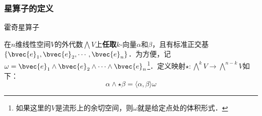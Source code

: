 





\subsubsection{星算子的定义}


\begin{definition}{霍奇星算子}

在$n$维线性空间$V$的外代数$\bigwedge V$上\textbf{任取}$k$-向量$\alpha$和$\beta$，且有标准正交基$\{\bvec{e}_1, \bvec{e}_2, \cdots, \bvec{e}_n\}$．为方便，记$\omega=\bvec{e}_1\wedge\bvec{e}_2\wedge\cdots\wedge\bvec{e}_n$\footnote{如果这里的$V$是流形上的余切空间，则$\omega$就是给定点处的体积形式．}．定义映射$\star:\bigwedge^k V \to \bigwedge^{n-k} V$如下：
\begin{equation}
\alpha\wedge\star\beta = \langle\alpha, \beta\rangle\omega
\end{equation}

\end{definition}


